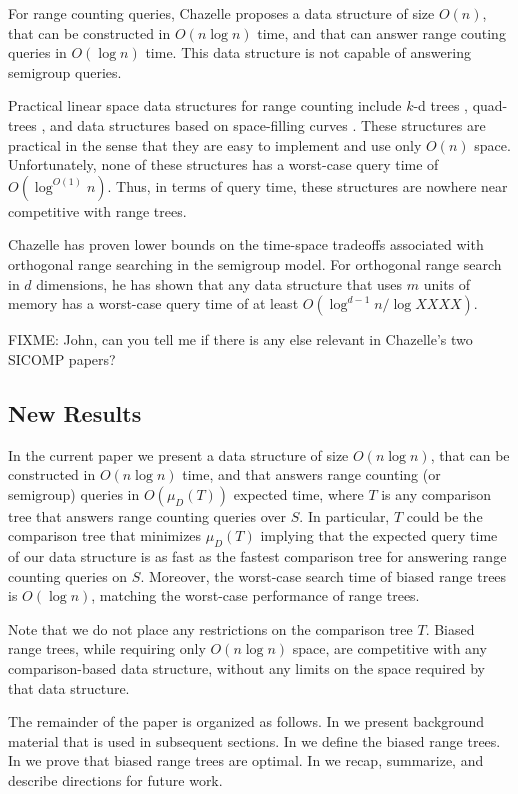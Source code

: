 \documentclass[lotsofwhite,charterfonts]{patmorin}
\begin{document}
For range counting queries, Chazelle proposes a data structure of size
$O(n)$, that can be constructed in $O(n\log n)$ time, and that can
answer range couting queries in $O(\log n)$ time.  This data structure
is not capable of answering semigroup queries.

Practical linear space data structures for range counting include
$k$-d trees \cite{X}, quad-trees \cite{X}, and data structures based
on space-filling curves \cite{X}.  These structures are practical in
the sense that they are easy to implement and use only $O(n)$ space.
Unfortunately, none of these structures has a worst-case query time of 
$O(\log^{O(1)} n)$.  Thus, in terms of query time, these structures are
nowhere near competitive with range trees.

Chazelle has proven lower bounds on the time-space tradeoffs
associated with orthogonal range searching in the semigroup model.
For orthogonal range search in $d$ dimensions, he has shown that any
data structure that uses $m$ units of memory has a worst-case query
time of at least $O(\log^{d-1} n/\log XXXX)$.

FIXME: John, can you tell me if there is any else relevant in
Chazelle's two SICOMP papers?

\subsection{New Results}

In the current paper we present a data structure of size $O(n\log n)$,
that can be constructed in $O(n\log n)$ time, and that answers range
counting (or semigroup) queries in $O(\mu_D(T))$ expected time, where
$T$ is any comparison tree that answers range counting queries over
$S$.  In particular, $T$ could be the comparison tree that minimizes
$\mu_D(T)$ implying that the expected query time of our data structure
is as fast as the fastest comparison tree for answering range counting
queries on $S$.  Moreover, the worst-case search time of biased
range trees is $O(\log n)$, matching the worst-case performance of
range trees.

Note that we do not place any restrictions on the comparison tree $T$.
Biased range trees, while requiring only $O(n\log n)$ space, are
competitive with any comparison-based data structure, without any
limits on the space required by that data structure. 
 
The remainder of the paper is organized as follows. In
 we present background material that is used in
subsequent sections.  In  we define the
biased range trees. In  we prove
that biased range trees are optimal.  In 
we recap, summarize, and describe directions for future work.
\end{document}
